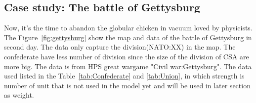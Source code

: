 \documentclass{article}
\begin{document}
\subsection{Case study: The battle of Gettysburg}

Now, it's the time to abandon the globular chicken in vacuum loved by physicists.
The Figure~\ref{fig:gettysburg} show the map and data of the battle of Gettysburg in second day.
The data only capture the division(NATO:XX)  in the map.
The confederate have less number of division since the size of the division of CSA are more big.
The data is from HPS great wargame "Civil war:Gettysburg". 
The data used listed in the Table~\ref{tab:Confederate} and \ref{tab:Union}, in which strength 
is number of unit that is not used in the model yet and will be used in later section as weight.
\end{document}
